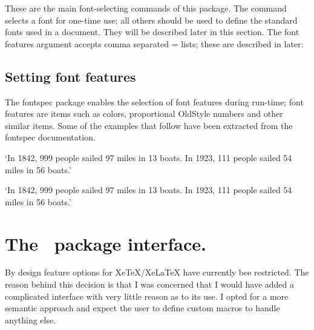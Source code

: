 These are the main font-selecting commands of this package. The 
command selects a font for one-time use; all others should be used to deﬁne the
standard fonts used in a document. They will be described later in this section.
The font features argument accepts comma separated =
lists; these are described in later:

\begin{texexample}{}{}
\raggedright
\lorem
\end{texexample}

\subsection{Setting font features}

The fontspec package enables the selection of font features during run-time; font features are items such as colors, proportional OldStyle numbers and other similar items. Some of the examples that follow have been extracted from the fontspec documentation.


\begin{texexample}{}{}
`In 1842, 999 people sailed 97 miles in
13 boats. In 1923, 111 people sailed 54
miles in 56 boats.' \bigskip

`In 1842, 999 people sailed 97 miles in
13 boats. In 1923, 111 people sailed 54
miles in 56 boats.' \bigskip
\end{texexample}

\section{The \athena\ package interface.}

By design feature options for XeTeX/XeLaTeX have currently bee restricted. The reason behind this decision is that I was concerned that I would have added a complicated interface with very little reason as to its use. I opted for a more semantic approach and expect the user to define custom macros to handle anything else.
\medskip


